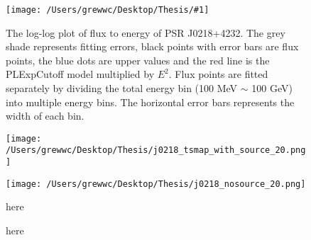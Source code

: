 \documentclass[12pt]{report}
\newcommand{\mycaption}[1]{\protect \caption{#1}}
\newcommand{\singleFig}[3]{
 \begin{figure}[!ht]
  \centering
  \texttt{[image: /Users/grewwc/Desktop/Thesis/\#1]}
  \mycaption{#3}
 \label{fig: #1}
 \end{figure}
}
\newcommand{\change}[1]{
  $<$\colorbox{red}{\textbf{change}}$>$#1$<$\colorbox{red}{\textbf{/change}}$>$
}
\begin{document}
            \singleFig{j0218_cur.png}{0.40}{
              The log-log plot of flux to energy of PSR J0218+4232. The grey shade represents 
              fitting errors, black points with error bars are flux points, the blue dots are upper values and the 
              red line is the PLExpCutoff model multiplied by $E^2$. Flux points 
              are fitted separately by dividing the total energy bin (100 MeV $\sim$ 100 GeV) into multiple energy bins.
              The horizontal error bars represents the width of each bin. \\
            }
            \vspace{1cm}
            \begin{figure}[!ht]
              \begin{center}
              \begin{minipage}{0.46\textwidth}
                \begin{center} 
                  \texttt{[image: /Users/grewwc/Desktop/Thesis/j0218\_tsmap\_with\_source\_20.png]}
                \end{center}
              \end{minipage}
              \begin{minipage}{0.45\textwidth}
                \begin{center}
                  \texttt{[image: /Users/grewwc/Desktop/Thesis/j0218\_nosource\_20.png]}
                \end{center}
              \end{minipage}
            \end{center}
            \caption{here}
            
            \caption{here}

            \label{fig: j0218_tsmap_comparison_20}
            \end{figure}
\end{document}
